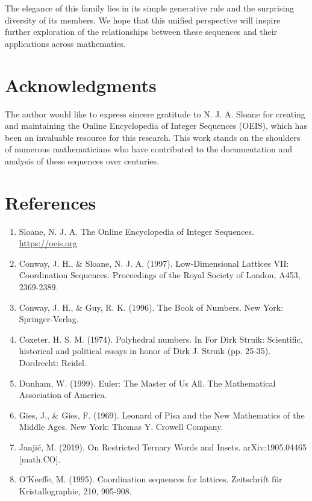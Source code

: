 \documentclass[12pt,a4paper]{article}
\begin{document}
The elegance of this family lies in its simple generative rule and the surprising diversity of its members. We hope that this unified perspective will inspire further exploration of the relationships between these sequences and their applications across mathematics.

\section*{Acknowledgments}

The author would like to express sincere gratitude to N. J. A. Sloane for creating and maintaining the Online Encyclopedia of Integer Sequences (OEIS), which has been an invaluable resource for this research. This work stands on the shoulders of numerous mathematicians who have contributed to the documentation and analysis of these sequences over centuries.

\section*{References}

\begin{enumerate}
    \item Sloane, N. J. A. The Online Encyclopedia of Integer Sequences. \url{https://oeis.org}
    
    \item Conway, J. H., \& Sloane, N. J. A. (1997). Low-Dimensional Lattices VII: Coordination Sequences. Proceedings of the Royal Society of London, A453, 2369-2389.
    
    \item Conway, J. H., \& Guy, R. K. (1996). The Book of Numbers. New York: Springer-Verlag.
    
    \item Coxeter, H. S. M. (1974). Polyhedral numbers. In For Dirk Struik: Scientific, historical and political essays in honor of Dirk J. Struik (pp. 25-35). Dordrecht: Reidel.
    
    \item Dunham, W. (1999). Euler: The Master of Us All. The Mathematical Association of America.
    
    \item Gies, J., \& Gies, F. (1969). Leonard of Pisa and the New Mathematics of the Middle Ages. New York: Thomas Y. Crowell Company.
    
    \item Janjić, M. (2019). On Restricted Ternary Words and Insets. arXiv:1905.04465 [math.CO].
    
    \item O'Keeffe, M. (1995). Coordination sequences for lattices. Zeitschrift für Kristallographie, 210, 905-908.
\end{enumerate}
\end{document}
